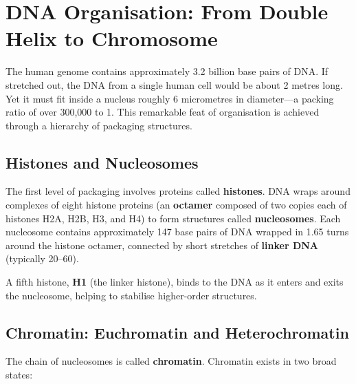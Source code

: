 \section{DNA Organisation: From Double Helix to Chromosome}
\label{sec:molbio:dna-organisation}

The human genome contains approximately 3.2 billion base pairs of DNA. If stretched out, the DNA from a single human cell would be about 2 metres long. Yet it must fit inside a nucleus roughly 6 micrometres in diameter---a packing ratio of over 300,000 to 1. This remarkable feat of organisation is achieved through a hierarchy of packaging structures.

\subsection{Histones and Nucleosomes}
\label{subsec:molbio:nucleosomes}

The first level of packaging involves proteins called \textbf{histones}. DNA wraps around complexes of eight histone proteins (an \textbf{octamer} composed of two copies each of histones H2A, H2B, H3, and H4) to form structures called \textbf{nucleosomes}. Each nucleosome contains approximately 147 base pairs of DNA wrapped in 1.65 turns around the histone octamer, connected by short stretches of \textbf{linker DNA} (typically 20--60\basepair{}).

A fifth histone, \textbf{H1} (the linker histone), binds to the DNA as it enters and exits the nucleosome, helping to stabilise higher-order structures.

\subsection{Chromatin: Euchromatin and Heterochromatin}
\label{subsec:molbio:chromatin}

The chain of nucleosomes is called \textbf{chromatin}. Chromatin exists in two broad states:

